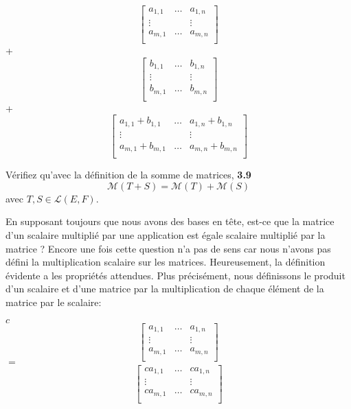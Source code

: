 \documentclass[12pt]{book}
\begin{document}
\begin{equation*}\begin{bmatrix}
    a_{1,1} & \ldots & a_{1,n} \\
    \vdots & & \vdots\\
    a_{m,1} & \ldots & a_{m,n} \\
\end{bmatrix}\end{equation*}
+ 
\begin{equation*}\begin{bmatrix}
    b_{1,1} & \ldots & b_{1,n} \\
    \vdots & & \vdots\\
    b_{m,1} & \ldots & b_{m,n} \\
\end{bmatrix}\end{equation*}
+
\begin{equation*}\begin{bmatrix}
    a_{1,1} + b_{1,1} & \ldots & a_{1,n} + b_{1,n} \\
    \vdots & & \vdots\\
    a_{m,1} + b_{m,1} & \ldots & a_{m,n} + b_{m,n} \\
\end{bmatrix}\end{equation*}

Vérifiez qu'avec la définition de la somme de matrices,
\textbf{3.9}
\begin{equation*}
\mathcal{M}(T+S) = \mathcal{M}(T) + \mathcal{M}(S) 
\end{equation*}
avec $T,S\in\mathcal{L}(E,F)$.

En supposant toujours que nous avons des bases en tête, est-ce que la matrice d'un scalaire multiplié par une application est égale scalaire multiplié par la matrice ? Encore une fois cette question n'a pas de sens car nous n'avons pas défini la multiplication scalaire sur les matrices. Heureusement, la définition évidente a les propriétés attendues. Plus précisément, nous définissons le produit d'un scalaire et d'une matrice par la multiplication de chaque élément de la matrice par le scalaire:

$c$
\begin{equation*}\begin{bmatrix}
    a_{1,1} & \ldots & a_{1,n} \\
    \vdots & & \vdots\\
    a_{m,1} & \ldots & a_{m,n} \\
\end{bmatrix}\end{equation*}
$=$
\begin{equation*}\begin{bmatrix}
    ca_{1,1} & \ldots & ca_{1,n} \\
    \vdots & & \vdots\\
    ca_{m,1} & \ldots & ca_{m,n} \\
\end{bmatrix}\end{equation*}
\end{document}
